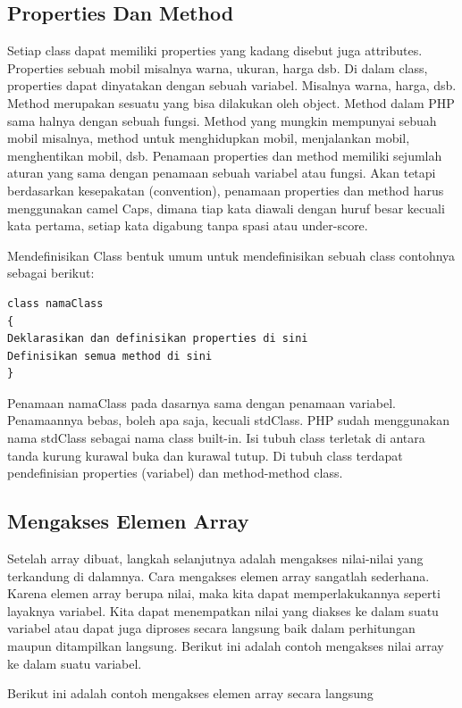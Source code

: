 \subsection{Properties Dan Method}
Setiap class dapat memiliki properties yang kadang disebut juga attributes. Properties sebuah mobil misalnya warna, ukuran, harga dsb. Di dalam class, properties dapat dinyatakan dengan sebuah variabel. Misalnya warna, harga, dsb. Method merupakan sesuatu yang bisa dilakukan oleh object. Method dalam PHP sama halnya dengan sebuah fungsi. Method yang mungkin mempunyai
sebuah mobil misalnya, method untuk menghidupkan mobil, menjalankan mobil, menghentikan mobil, dsb. Penamaan properties dan method memiliki sejumlah aturan yang sama dengan penamaan sebuah variabel atau fungsi. Akan tetapi berdasarkan kesepakatan
(convention), penamaan properties dan method harus menggunakan camel Caps, dimana tiap kata diawali dengan huruf besar kecuali kata pertama, setiap kata digabung tanpa spasi atau under-score.
\par
Mendefinisikan Class bentuk umum untuk mendefinisikan sebuah class contohnya sebagai berikut:
\begin{lstlisting}
class namaClass
{
Deklarasikan dan definisikan properties di sini
Definisikan semua method di sini
} 
\end{lstlisting}

Penamaan namaClass pada dasarnya sama dengan penamaan variabel. Penamaannya bebas, boleh apa saja, kecuali stdClass. PHP sudah menggunakan nama stdClass sebagai nama class built-in. Isi tubuh class terletak di antara tanda kurung kurawal buka  dan kurawal tutup. Di tubuh class terdapat pendefinisian properties (variabel) dan method-method class. 


\subsection{Mengakses Elemen Array}
Setelah array dibuat, langkah selanjutnya adalah mengakses nilai-nilai yang terkandung di dalamnya.
Cara mengakses elemen array sangatlah sederhana. Karena elemen array berupa nilai, maka kita dapat
memperlakukannya seperti layaknya variabel.
Kita dapat menempatkan nilai yang diakses ke dalam suatu variabel atau dapat juga diproses secara
langsung baik dalam perhitungan maupun ditampilkan langsung.
Berikut ini adalah contoh mengakses nilai array ke dalam suatu variabel.


Berikut ini adalah contoh mengakses elemen array secara langsung


